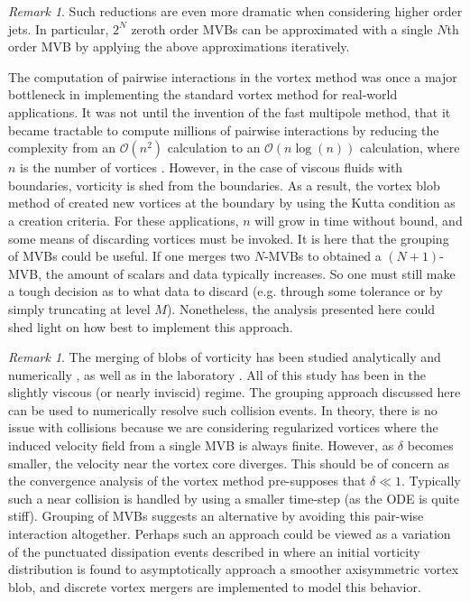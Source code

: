 \documentclass[12pt]{amsart}
\theoremstyle{remark}
\newtheorem{rmk}[thm]{Remark}
\begin{document}
\begin{rmk}
Such reductions are even more dramatic when considering higher order jets.
In particular, $2^N$ zeroth order MVBs can be approximated with a single $N$th order MVB by applying the above approximations iteratively.

The computation of pairwise interactions in the vortex method was once a major bottleneck in implementing the standard vortex method for real-world applications.
It was not until the invention of the fast multipole method, that it became tractable to compute millions of pairwise interactions by
reducing the complexity from an $\mathcal{O}(n^2)$ calculation to an $\mathcal{O}(n \log (n))$ calculation, where $n$ is the number of vortices \cite{GreengardRokhlin1987}.
However, in the case of viscous fluids with boundaries, vorticity is shed from the boundaries.
As a result, the vortex blob method of \cite{Chorin1973} created new vortices at the boundary by using the Kutta condition as a creation criteria.
For these applications, $n$ will grow in time without bound, and some means of discarding vortices must be invoked.
It is here that the grouping of MVBs  could be useful.
If one merges two $N$-MVBs to obtained a $(N+1)$-MVB, the amount of scalars and data typically increases.
So one must still make a tough decision as to what data to discard (e.g. through some tolerance or by simply truncating at level $M$).
Nonetheless, the analysis presented here could shed light on how best to implement this approach.
\end{rmk}

\begin{rmk}
The merging of blobs of vorticity has been studied analytically \cite{MelanderZabuskyMcWilliams1998} and 
numerically \cite{WeissMcWilliams1993,MelanderZabuskyMcWilliams1998,DizesVerga2002},
as well as in the laboratory \cite{FineDriscollMalmbergMitchell1991}.
All of this study has been in the slightly viscous (or nearly inviscid) regime.
The grouping approach discussed here can be used to numerically resolve such collision events.
In theory, there is no issue with collisions because we are considering regularized vortices where
the induced velocity field from a single MVB is always finite.
However, as $\delta$ becomes smaller, the velocity near the vortex core diverges.
This should be of concern as the convergence analysis of the vortex method pre-supposes that $\delta \ll 1$.
Typically such a near collision is handled by using a smaller time-step (as the ODE is quite stiff).
Grouping of MVBs suggests an alternative by avoiding this pair-wise interaction altogether.
Perhaps such an approach could be viewed as a variation of the punctuated dissipation events
described in \cite{WeissMcWilliams1993} where an initial vorticity distribution is found to asymptotically
approach a smoother axisymmetric vortex blob,
and discrete vortex mergers are implemented to model this behavior.
\end{rmk}
\end{document}
